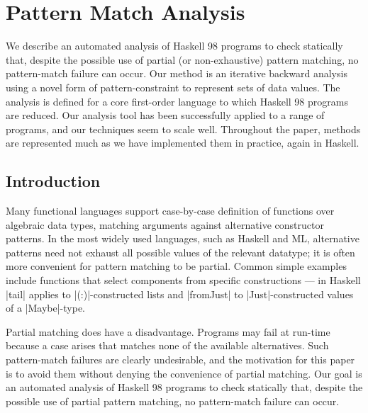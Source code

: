 

\chapter{Pattern Match Analysis}


We describe an automated analysis of Haskell 98 programs to check
statically that, despite the possible use of partial (or non-exhaustive)
pattern matching, no pattern-match failure can occur.  Our method is an
iterative backward analysis using a novel form of pattern-constraint
to represent sets of data values.  The analysis is defined for a
core first-order language to which Haskell 98 programs are reduced.
Our analysis tool has been successfully applied to a range of programs,
and our techniques seem to scale well.  Throughout the paper, methods
are represented much as we have implemented them in practice, again in Haskell.


\begin{comment}
\begin{code}
data Constraint = Constraint
\end{code}
\begin{code}
data Assert a = a :< Constraint
\end{code}
\begin{code}
infix  4  ==, /=
infixr 2  ||

(||) :: Bool -> Bool -> Bool
(==) :: Eq a => a -> a -> Bool
(/=) :: Eq a => a -> a -> Bool
map :: (a -> b) -> [a] -> [b]
\end{code}
\end{comment}

\section{Introduction}
\label{sec:introduction}

Many functional languages support case-by-case definition of functions
over algebraic data types, matching arguments against alternative
constructor patterns.  In the most widely used languages, such as Haskell
and ML, alternative patterns need not exhaust all possible values of
the relevant datatype; it is often more convenient for pattern matching
to be partial.  Common simple examples include functions that select
components from specific constructions --- in Haskell |tail| applies
to |(:)|-constructed lists and |fromJust| to |Just|-constructed values of
a |Maybe|-type.

Partial matching does have a disadvantage.  Programs may fail at run-time
because a case arises that matches none of the available alternatives.
Such pattern-match failures are clearly undesirable, and the motivation
for this paper is to avoid them without denying the convenience of
partial matching.  Our goal is an automated analysis of Haskell 98 programs
to check statically that, despite the possible use of partial pattern
matching, no pattern-match failure can occur.


